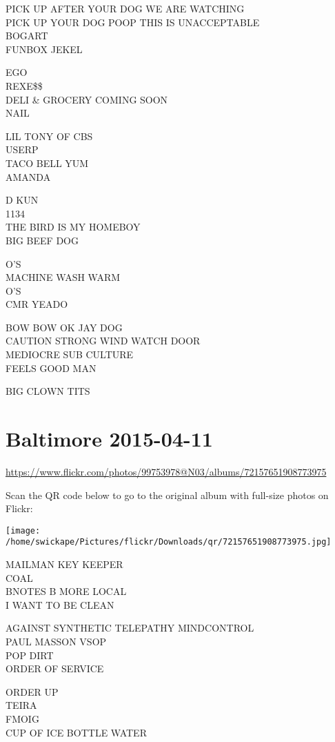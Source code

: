 \documentclass[10pt,letterpaper]{article}
\begin{document}
PICK UP AFTER YOUR DOG WE ARE WATCHING\\
PICK UP YOUR DOG POOP THIS IS UNACCEPTABLE\\
BOGART\\
FUNBOX JEKEL

EGO\\
REXE\$\$\\
DELI \& GROCERY COMING SOON\\
NAIL

LIL TONY OF CBS\\
USERP\\
TACO BELL YUM\\
AMANDA

D KUN\\
1134\\
THE BIRD IS MY HOMEBOY\\
BIG BEEF DOG

O'S\\
MACHINE WASH WARM\\
O'S\\
CMR YEADO

BOW BOW OK JAY DOG\\
CAUTION STRONG WIND WATCH DOOR\\
MEDIOCRE SUB CULTURE\\
FEELS GOOD MAN

BIG CLOWN TITS


\section*{Baltimore 2015-04-11}

\url{https://www.flickr.com/photos/99753978@N03/albums/72157651908773975}

Scan the QR code below to go to the original album with full-size photos on Flickr:

\texttt{[image: /home/swickape/Pictures/flickr/Downloads/qr/72157651908773975.jpg]}


MAILMAN KEY KEEPER\\
COAL\\
BNOTES B MORE LOCAL\\
I WANT TO BE CLEAN

AGAINST SYNTHETIC TELEPATHY MINDCONTROL\\
PAUL MASSON VSOP\\
POP DIRT\\
ORDER OF SERVICE

ORDER UP\\
TEIRA\\
FMOIG\\
CUP OF ICE BOTTLE WATER
\end{document}
